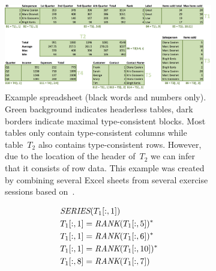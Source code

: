 \begin{figure}[thb]

  \begin{subfigure}{.66\textwidth}
  \begin{center}
    \includegraphics[width=1\textwidth]{figures/Demo2.png}
  \end{center}
  \vspace{-10pt}
  \caption{
    Example spreadsheet (black words and numbers only).
    Green background indicates headerless tables, dark borders indicate maximal type-consistent blocks.
    Most tables only contain type-consistent columns while table~$T_2$ also contains type-consistent rows.
    However, due to the location of the header of~$T_2$ we can infer that it consists of row data.
    This example was created by combining several Excel sheets from several exercise sessions based on~\cite{excel_book}.
  }
  \label{fig:main_example}
\end{subfigure}
\hfill
\begin{subfigure}{.34\textwidth}
  {\footnotesize
    \begin{align*}
      &~\ecseries{\range{T_{1}}{\rangeall}{1}} \\
%
%
      &~\ecrank{\range{T_{1}}{\rangeall}{1}}{\range{T_{1}}{\rangeall}{5}}^*\\
      &~\ecrank{\range{T_{1}}{\rangeall}{1}}{\range{T_{1}}{\rangeall}{6}}^* \\
      &~\ecrank{\range{T_{1}}{\rangeall}{1}}{\range{T_{1}}{\rangeall}{10}}^*\\
      &~\ecrank{\range{T_{1}}{\rangeall}{8}}{\range{T_{1}}{\rangeall}{7}} \\

\end{align*}}
\end{subfigure}
\end{figure}

